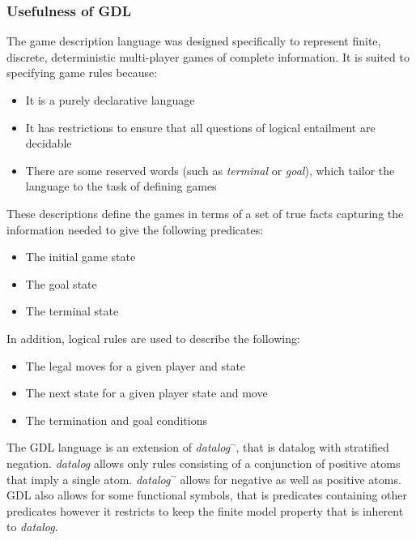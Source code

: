 \subsubsection{Usefulness of GDL}
The game description language was designed specifically to represent finite, discrete, deterministic multi-player games of complete information. It is suited to specifying game rules because:
\begin{itemize}
\item It is a purely declarative language
\item It has restrictions to ensure that all questions of logical entailment are decidable
\item There are some reserved words (such as \textit{terminal} or \textit{goal}), which tailor the language to the task of defining games
\end{itemize}
These descriptions define the games in terms of a set of true facts capturing the information needed to give the following predicates:
\begin{itemize}
\item The initial game state
\item The goal state
\item The terminal state
\end{itemize}
In addition, logical rules are used to describe the following:
\begin{itemize}
\item The legal moves for a given player and state
\item The next state for a given player state and move
\item The termination and goal conditions
\end{itemize}

The GDL language is an extension of \textit{datalog$^{\neg}$}\cite{GDL_Spec}, that is datalog with stratified negation. \textit{datalog} allows only rules consisting of a conjunction of positive atoms that imply a single atom. \textit{datalog$^{\neg}$} allows for negative as well as positive atoms\cite{Alice/Foundations}. GDL also allows for some functional symbols, that is predicates containing other predicates however it restricts to keep the finite model property that is inherent to \textit{datalog}\cite{GDL_Spec}.

